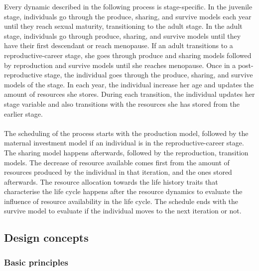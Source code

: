 \documentclass{article}
\begin{document}
Every dynamic described in the following process is stage-specific. In the juvenile stage, individuals go through the produce, sharing, and survive models each year until they reach sexual maturity, transitioning to the adult stage. In the adult stage, individuals go through produce, sharing, and survive models until they have their first descendant or reach menopause. If an adult transitions to a reproductive-career stage, she goes through produce and sharing models followed by reproduction and survive models until she reaches menopause. Once in a post-reproductive stage, the individual goes through the produce, sharing, and survive models of the stage. In each year, the individual increase her age and updates the amount of resources she stores. During each transition, the individual updates her stage variable and also transitions with the resources she has stored from the earlier stage.
\\\\
The scheduling of the process starts with the production model, followed by the maternal investment model if an individual is in the reproductive-career stage. The sharing model happens afterwards, followed by the reproduction, transition models. The decrease of resource available comes first from the amount of resources produced by the individual in that iteration, and the ones stored afterwards. The resource allocation towards the life history traits that characterise the life cycle happens after the resource dynamics to evaluate the influence of resource availability in the life cycle. The schedule ends with the survive model to evaluate if the individual moves to the next iteration or not.

\subsection{Design concepts}

\subsubsection{Basic principles}
\end{document}
